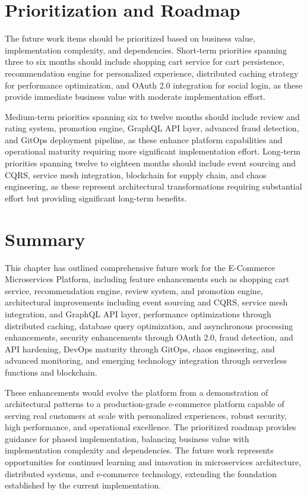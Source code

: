\section{Prioritization and Roadmap}

The future work items should be prioritized based on business value, implementation complexity, and dependencies. Short-term priorities spanning three to six months should include shopping cart service for cart persistence, recommendation engine for personalized experience, distributed caching strategy for performance optimization, and OAuth 2.0 integration for social login, as these provide immediate business value with moderate implementation effort.

Medium-term priorities spanning six to twelve months should include review and rating system, promotion engine, GraphQL API layer, advanced fraud detection, and GitOps deployment pipeline, as these enhance platform capabilities and operational maturity requiring more significant implementation effort. Long-term priorities spanning twelve to eighteen months should include event sourcing and CQRS, service mesh integration, blockchain for supply chain, and chaos engineering, as these represent architectural transformations requiring substantial effort but providing significant long-term benefits.

\section{Summary}

This chapter has outlined comprehensive future work for the E-Commerce Microservices Platform, including feature enhancements such as shopping cart service, recommendation engine, review system, and promotion engine, architectural improvements including event sourcing and CQRS, service mesh integration, and GraphQL API layer, performance optimizations through distributed caching, database query optimization, and asynchronous processing enhancements, security enhancements through OAuth 2.0, fraud detection, and API hardening, DevOps maturity through GitOps, chaos engineering, and advanced monitoring, and emerging technology integration through serverless functions and blockchain.

These enhancements would evolve the platform from a demonstration of architectural patterns to a production-grade e-commerce platform capable of serving real customers at scale with personalized experiences, robust security, high performance, and operational excellence. The prioritized roadmap provides guidance for phased implementation, balancing business value with implementation complexity and dependencies. The future work represents opportunities for continued learning and innovation in microservices architecture, distributed systems, and e-commerce technology, extending the foundation established by the current implementation.
